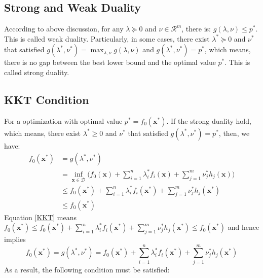 \documentclass[10pt,a4paper]{article}
\begin{document}
\subsection{Strong and Weak Duality}
According to above discussion, for any $\lambda \succeq 0$ and $\nu \in \mathcal{R}^{m}$, there is: $g(\lambda, \nu) \leq p^{*}$. This is called weak duality. Particularly, in some cases, there exist $\lambda^{*} \succeq 0$ and $\nu^{*}$ that satisfied $g(\lambda^{*}, \nu^{*}) = \displaystyle\max_{\lambda, \nu}g(\lambda, \nu)$ and $g(\lambda^{*}, \nu^{*}) = p^{*}$, which means, there is no gap between the best lower bound and the optimal value $p^{*}$. This is called strong duality.

\subsection{KKT Condition}
For a optimization with optimal value $p^{*} = f_{0}(\mathbf{x}^{*})$. If the strong duality hold, which means, there exist $\lambda^{*} \geq 0$ and $\nu^{*}$ that satisfied $g(\lambda^{*}, \nu^{*}) = p^{*}$, then, we have:
\begin{equation}
	\begin{aligned}
		f_{0}(\mathbf{x}^{*}) &= g(\lambda^{*}, \nu^{*}) \\
		&= \displaystyle\inf_{\mathbf{x} \in \mathcal{D}}\Big( f_{0}(\mathbf{x}) + \displaystyle\sum_{i = 1}^{n}\lambda_{i}^{*} f_{i}(\mathbf{x}) + \displaystyle\sum_{j = 1}^{m} \nu_{j}^{*} h_{j}(\mathbf{x}) \Big) \\
		&\leq f_{0}(\mathbf{x}^{*}) + \displaystyle\sum_{i = 1}^{n}\lambda_{i}^{*} f_{i}(\mathbf{x}^{*}) + \displaystyle\sum_{j = 1}^{m} \nu_{j}^{*} h_{j}(\mathbf{x}^{*}) \\
		&\leq f_{0}(\mathbf{x}^{*})
	\end{aligned}
	\label{KKT}
\end{equation}
Equation \ref{KKT} means $f_{0}(\mathbf{x}^{*}) \leq f_{0}(\mathbf{x}^{*}) + \displaystyle\sum_{i = 1}^{n}\lambda_{i}^{*} f_{i}(\mathbf{x}^{*}) + \displaystyle\sum_{j = 1}^{m} \nu_{j}^{*} h_{j}(\mathbf{x}^{*}) \leq f_{0}(\mathbf{x}^{*})$ and hence implies
\begin{equation}
	f_{0}(\mathbf{x}^{*}) = g(\lambda^{*}, \nu^{*}) = f_{0}(\mathbf{x}^{*}) + \displaystyle\sum_{i = 1}^{n}\lambda_{i}^{*} f_{i}(\mathbf{x}^{*}) + \displaystyle\sum_{j = 1}^{m} \nu_{j}^{*} h_{j}(\mathbf{x}^{*})
	\label{KKT_2}
\end{equation}
As a result, the following condition must be satisfied:
\end{document}
